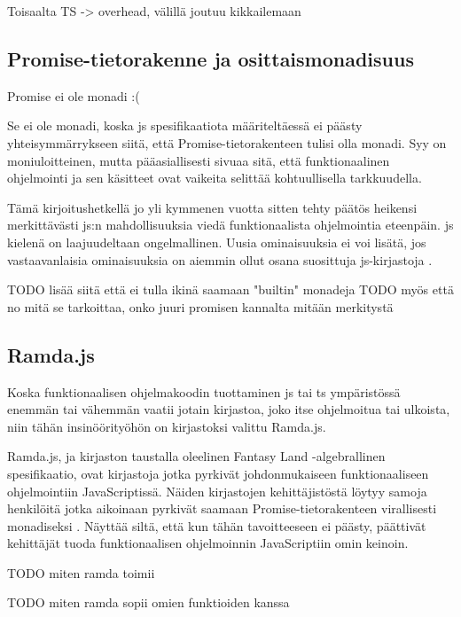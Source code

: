 Toisaalta TS -> overhead, välillä joutuu kikkailemaan

\subsection{Promise-tietorakenne ja osittaismonadisuus}

Promise ei ole monadi :( \cite{read-it-later-11481,promises-spec-94}

Se ei ole monadi, koska \gls{js} spesifikaatiota määriteltäessä ei päästy yhteisymmärrykseen siitä, että Promise-tietorakenteen tulisi olla monadi. Syy on moniuloitteinen, mutta pääasiallisesti sivuaa sitä, että funktionaalinen ohjelmointi ja sen käsitteet ovat vaikeita selittää kohtuullisella tarkkuudella. \citep{promises-spec-94}

Tämä kirjoitushetkellä jo yli kymmenen vuotta sitten tehty päätös heikensi merkittävästi \gls{js}:n mahdollisuuksia viedä funktionaalista ohjelmointia eteenpäin. \Gls{js} kielenä on laajuudeltaan ongelmallinen. Uusia ominaisuuksia ei voi lisätä, jos vastaavanlaisia ominaisuuksia on aiemmin ollut osana suosittuja \gls{js}-kirjastoja \cite{proposal-joint-iteration,prototype_library_trends}.

TODO lisää siitä että ei tulla ikinä saamaan "builtin" monadeja
TODO myös että no mitä se tarkoittaa, onko juuri promisen kannalta mitään merkitystä

\subsection{Ramda.js}

Koska funktionaalisen ohjelmakoodin tuottaminen \gls{js} tai \gls{ts} ympäristössä enemmän tai vähemmän vaatii jotain kirjastoa, joko itse ohjelmoitua tai ulkoista, niin tähän insinöörityöhön on kirjastoksi valittu Ramda.js.

Ramda.js, ja kirjaston taustalla oleelinen Fantasy Land -algebrallinen spesifikaatio, ovat kirjastoja jotka pyrkivät johdonmukaiseen funktionaaliseen ohjelmointiin JavaScriptissä. Näiden kirjastojen kehittäjistöstä löytyy samoja henkilöitä jotka aikoinaan pyrkivät saamaan Promise-tietorakenteen virallisesti monadiseksi \cite{ramda:contributors,fantasy-land:contributors,promises-spec-94}. Näyttää siltä, että kun tähän tavoitteeseen ei päästy, päättivät kehittäjät tuoda funktionaalisen ohjelmoinnin JavaScriptiin omin keinoin.

TODO miten ramda toimii

TODO miten ramda sopii omien funktioiden kanssa

